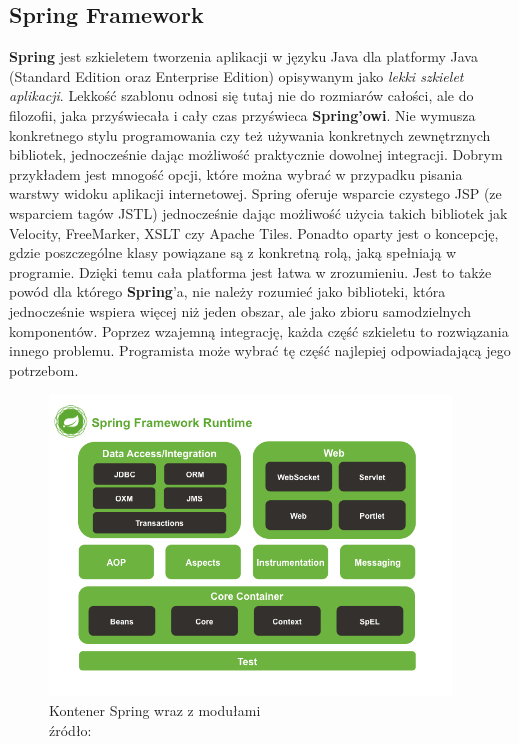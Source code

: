 \subsection{Spring Framework}
	\textbf{Spring} jest szkieletem tworzenia aplikacji w języku Java dla platformy Java (Standard Edition oraz Enterprise Edition) opisywanym jako \textit{lekki szkielet aplikacji}. Lekkość szablonu odnosi się tutaj nie do rozmiarów całości, ale do filozofii, jaka przyświecała i cały czas przyświeca \textbf{Spring'owi}. Nie wymusza konkretnego stylu programowania czy też używania konkretnych zewnętrznych bibliotek, jednocześnie dając możliwość praktycznie dowolnej integracji. Dobrym przykładem jest mnogość opcji, które można wybrać w przypadku pisania warstwy widoku aplikacji internetowej. Spring oferuje wsparcie czystego JSP (ze wsparciem tagów JSTL) jednocześnie dając możliwość użycia takich bibliotek jak Velocity, FreeMarker, XSLT czy Apache Tiles. Ponadto oparty jest o koncepcję, gdzie poszczególne klasy powiązane są z konkretną rolą, jaką spełniają w programie. Dzięki temu cała platforma jest łatwa w zrozumieniu. Jest to także powód dla którego \textbf{Spring}'a, nie należy rozumieć jako biblioteki, która jednocześnie wspiera więcej niż jeden obszar, ale jako zbioru samodzielnych komponentów. Poprzez wzajemną integrację, każda część szkieletu to rozwiązania innego problemu. Programista może wybrać tę część najlepiej odpowiadającą jego potrzebom.
	\begin{figure}[h]
		\centering
		\includegraphics[width=0.95\textwidth]{images/spring-overview}
		\caption[Kontener Spring]{Kontener Spring wraz z modułami\\źródło: \cite{spring_documentation_reference}}
		\label{c3:information_level_figure}
	\end{figure}	
